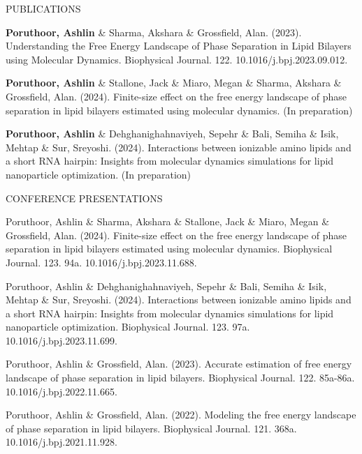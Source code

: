 \documentclass{resume} %
\begin{document}
\begin{rSection}{PUBLICATIONS}

   \item \textbf{Poruthoor, Ashlin} \& Sharma, Akshara \& Grossfield, Alan. (2023). Understanding the Free Energy Landscape of Phase Separation in Lipid Bilayers using Molecular Dynamics. Biophysical Journal. 122. 10.1016/j.bpj.2023.09.012.
   \item \textbf{Poruthoor, Ashlin} \& Stallone, Jack \& Miaro, Megan \& Sharma, Akshara \& Grossfield, Alan. (2024). Finite-size effect on the free energy landscape of phase separation in lipid bilayers estimated using molecular dynamics. (In preparation)
   \item \textbf{Poruthoor, Ashlin} \& Dehghanighahnaviyeh, Sepehr \& Bali, Semiha \& Isik, Mehtap \& Sur, Sreyoshi. (2024). Interactions between ionizable amino lipids and a short RNA hairpin: Insights from molecular dynamics simulations for lipid nanoparticle optimization. (In preparation)

\end{rSection}

\begin{rSection}{CONFERENCE PRESENTATIONS}

   \item Poruthoor, Ashlin \& Sharma, Akshara \& Stallone, Jack \& Miaro, Megan \& Grossfield, Alan. (2024). Finite-size effect on the free energy landscape of phase separation in lipid bilayers estimated using molecular dynamics. Biophysical Journal. 123. 94a. 10.1016/j.bpj.2023.11.688.
   \item Poruthoor, Ashlin \& Dehghanighahnaviyeh, Sepehr \& Bali, Semiha \& Isik, Mehtap \& Sur, Sreyoshi. (2024). Interactions between ionizable amino lipids and a short RNA hairpin: Insights from molecular dynamics simulations for lipid nanoparticle optimization. Biophysical Journal. 123. 97a. 10.1016/j.bpj.2023.11.699.
   \item Poruthoor, Ashlin \& Grossfield, Alan. (2023). Accurate estimation of free energy landscape of phase separation in lipid bilayers. Biophysical Journal. 122. 85a-86a. 10.1016/j.bpj.2022.11.665.
   \item Poruthoor, Ashlin \& Grossfield, Alan. (2022). Modeling the free energy landscape of phase separation in lipid bilayers. Biophysical Journal. 121. 368a. 10.1016/j.bpj.2021.11.928.

\end{rSection}
\end{document}
